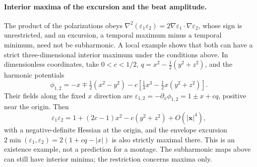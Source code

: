 
\paragraph{Interior maxima of the excursion and the beat amplitude.}
The product of the polarizations obeys
$\nabla^2(\varepsilon_1\varepsilon_2)=2\nabla\varepsilon_1\cdot\nabla\varepsilon_2$,
whose sign is unrestricted, and an excursion, a temporal maximum minus a temporal
minimum, need not be subharmonic. A local example shows that both can have a strict
three-dimensional interior maximum under the conditions above. In dimensionless
coordinates, take $0<c<1/2$, $q=x^2-\tfrac12(y^2+z^2)$, and the harmonic potentials
\[
\phi_{1,2}=-x\mp\tfrac12(x^2-y^2)-c\left[\tfrac13x^3-\tfrac12x(y^2+z^2)\right].
\]
Their fields along the fixed $x$ direction are
$\varepsilon_{1,2}=-\partial_x\phi_{1,2}=1\pm x+cq$, positive near the origin. Then
\[
\varepsilon_1\varepsilon_2=1+(2c-1)x^2-c(y^2+z^2)+O(|\mathbf x|^4),
\]
with a negative-definite Hessian at the origin, and the envelope excursion
$2\min(\varepsilon_1,\varepsilon_2)=2(1+cq-|x|)$ is also strictly maximal there.
This is an existence example, not a prediction for a montage. The subharmonic maps
above can still have interior minima; the restriction concerns maxima only.
